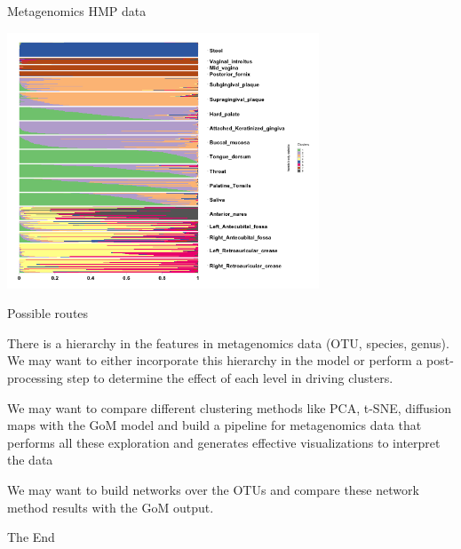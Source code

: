 \documentclass{beamer}\usepackage[]{graphicx}\usepackage[]{color}
\begin{document}
\begin{frame}[fragile]{Metagenomics HMP data \;\;}

\begin{center}
\includegraphics[height=3in]{metagenomics_hmp.png}
\end{center}

\end{frame}

\begin{frame}[fragile]{Possible routes \;\;}

There is a hierarchy in the features in metagenomics data (OTU, species, genus).
We may want to either incorporate this hierarchy in the model or perform a post-processing step to determine the effect of each level in driving clusters.
\pause \newline

We may want to compare different clustering methods like PCA, t-SNE, diffusion maps with the GoM model and build a pipeline for metagenomics data that performs all these exploration and generates effective visualizations to interpret the data \pause \newline

We may want to build networks over the OTUs and compare these network method results with the GoM output.

\end{frame}

\begin{frame}
\begin{center}
\Huge{The End}
\end{center}
\end{frame}
\end{document}
